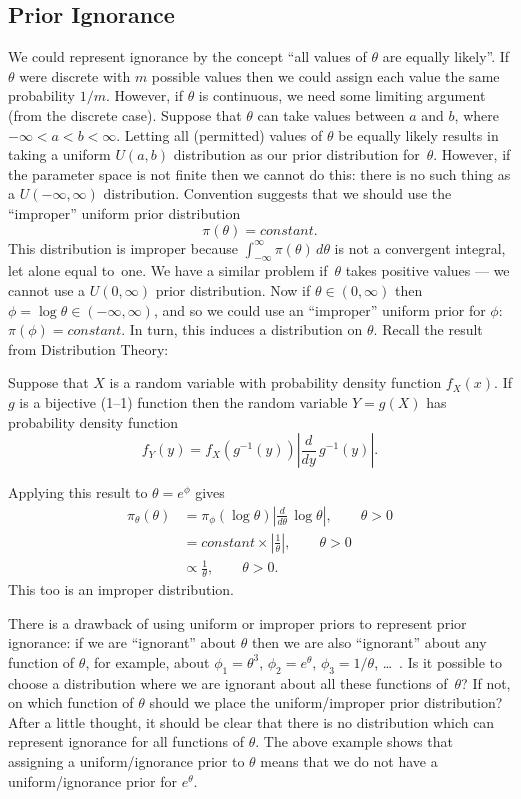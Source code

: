 \subsection*{Prior Ignorance}
We could represent ignorance by the concept ``all values of $\theta$ are equally likely''. If $\theta$ were discrete with $m$ possible values then we could assign each value the same probability $1/m$. However, if $\theta$ is continuous, we need some limiting argument (from the discrete case). Suppose that $\theta$ can take values between $a$ and $b$, where $-\infty<a<b<\infty$. Letting all (permitted) values of $\theta$ be equally likely results in taking a uniform $U(a,b)$ distribution as our prior distribution for~$\theta$. However, if the parameter space is not finite then we cannot do this: there is no such thing as a $U(-\infty,\infty)$ distribution. Convention suggests that we should use the ``improper'' uniform prior distribution
\begin{equation*}
\pi(\theta)=constant.
\end{equation*}
This distribution is improper because $\int_{-\infty}^\infty \pi(\theta)\,d\theta$ is not a convergent integral, let alone equal to~one. We have a similar problem if~$\theta$  takes positive values --- we cannot use a $U(0,\infty)$ prior distribution. Now if $\theta\in (0,\infty)$ then $\phi=\log\theta\in (-\infty,\infty)$, and so we could use an ``improper'' uniform prior for $\phi$: $\pi(\phi)=constant$. In turn, this induces a distribution on $\theta$. Recall the result from Distribution Theory:

Suppose that $X$ is a random variable with probability density function $f_X(x)$. If $g$ is a bijective (1--1) function then the random variable $Y=g(X)$ has probability density function
\begin{equation}
\label{eq:p14}
f_Y(y)=f_X\left(g^{-1}(y)\right)\left|\frac{d}{dy}\,g^{-1}(y)\right|.
\end{equation}

Applying this result to $\theta=e^\phi$ gives
\begin{align*}
\pi_\theta(\theta)
&=\pi_\phi(\log\theta)\left|\frac{d}{d\theta}\,\log\theta\right|,
\quad\quad\theta>0 \\
&=constant\times\left|\frac{1}{\theta}\right|,\quad\quad\theta>0 \\
&\propto\frac{1}{\theta},\quad\quad\theta>0.
\end{align*}
This too is an improper distribution.

There is a drawback of using uniform or improper priors to represent prior ignorance: if we are ``ignorant'' about $\theta$ then we are also ``ignorant'' about any function of $\theta$, for example, about
$\phi_1=\theta^3$, $\phi_2=e^\theta$, $\phi_3=1/\theta$,
\ldots~. Is it possible to choose a distribution where we are ignorant about all these functions of~$\theta$? If not, on which function of $\theta$ should we place the uniform/improper prior distribution? After a little thought, it should be clear that there is no distribution which can represent ignorance for all functions of $\theta$. The above example shows that assigning a uniform/ignorance prior to $\theta$ means that we do not have a uniform/ignorance prior for $e^\theta$.

